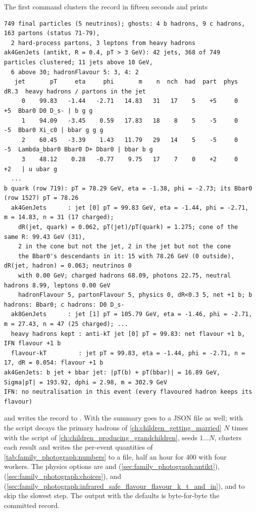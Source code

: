The first command clusters the record in fifteen seconds and prints
\begin{verbatim}
749 final particles (5 neutrinos); ghosts: 4 b hadrons, 9 c hadrons, 163 partons (status 71-79),
  2 hard-process partons, 3 leptons from heavy hadrons
ak4GenJets (antikt, R = 0.4, pT > 3 GeV): 42 jets, 368 of 749 particles clustered; 11 jets above 10 GeV,
  6 above 30; hadronFlavour 5: 3, 4: 2
   jet       pT     eta     phi       m    n  nch  had  part  phys  dR.3  heavy hadrons / partons in the jet
     0    99.83   -1.44   -2.71   14.83   31   17    5    +5     0    +5  Bbar0 D0 D_s- | b g g
     1    94.09   -3.45    0.59   17.83   18    8    5    -5     0    -5  Bbar0 Xi_c0 | bbar g g g
     2    60.45   -3.39    1.43   11.79   29   14    5    -5     0    -5  Lambda_bbar0 Bbar0 D+ Dbar0 | bbar b g
     3    48.12    0.28   -0.77    9.75   17    7    0    +2     0    +2   | u ubar g
  ...
b quark (row 719): pT = 78.29 GeV, eta = -1.38, phi = -2.73; its Bbar0 (row 1527) pT = 78.26
  ak4GenJets      : jet [0] pT = 99.83 GeV, eta = -1.44, phi = -2.71, m = 14.83, n = 31 (17 charged);
    dR(jet, quark) = 0.062, pT(jet)/pT(quark) = 1.275; cone of the same R: 99.43 GeV (31),
    2 in the cone but not the jet, 2 in the jet but not the cone
    the Bbar0's descendants in it: 15 with 78.26 GeV (0 outside), dR(jet, hadron) = 0.063; neutrinos 0
    with 0.00 GeV; charged hadrons 68.09, photons 22.75, neutral hadrons 8.99, leptons 0.00 GeV
    hadronFlavour 5, partonFlavour 5, physics 0, dR<0.3 5, net +1 b; b hadrons: Bbar0; c hadrons: D0 D_s-
  ak8GenJets      : jet [1] pT = 105.79 GeV, eta = -1.46, phi = -2.71, m = 27.43, n = 47 (25 charged); ...
  heavy hadrons kept : anti-kT jet [0] pT = 99.83: net flavour +1 b, IFN flavour +1 b
  flavour-kT         : jet pT = 99.83, eta = -1.44, phi = -2.71, n = 17, dR = 0.054: flavour +1 b
ak4GenJets: b jet + bbar jet: |pT(b) + pT(bbar)| = 16.89 GeV, Sigma|pT| = 193.92, dphi = 2.98, m = 302.9 GeV
IFN: no neutralisation in this event (every flavoured hadron keeps its flavour)
\end{verbatim}
and writes the record to . With
 the summary goes to a JSON file as well; with
 the script decays the primary hadrons of
\cref{ch:children_getting_married} $N$ times with the script of
\cref{ch:children_producing_grandchildren}, seeds $1\ldots N$, clusters
each result and writes the per-event quantities of
\cref{tab:family_photograph:numbers} to a  file, half an
hour for $400$ with four workers. The physics options are
 and  (\cref{sec:family_photograph:antikt}),
 (\cref{sec:family_photograph:choices}), 
and  (\cref{sec:family_photograph:infrared_safe_flavour_flavour_k_t_and_in}),
and  to skip the slowest step. The output with the
defaults is byte-for-byte the committed record.

